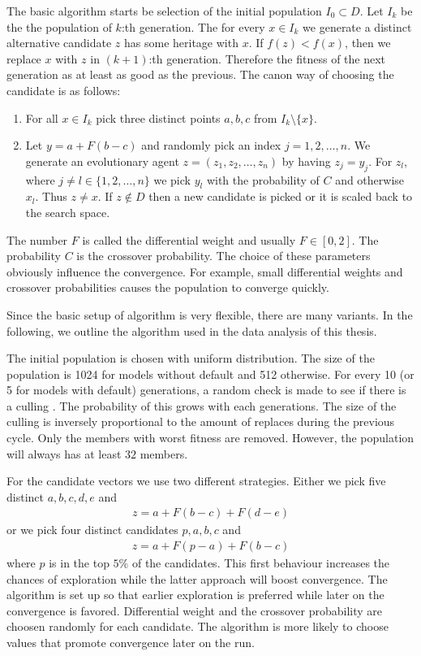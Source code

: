 The basic algorithm starts be selection of the initial population $I_0 \subset D$. Let $I_k$ be the the population of $k$:th generation. The for every $x \in I_k$ we generate a distinct alternative candidate $z$ has some heritage with $x$. If $f(z) < f(x)$, then we replace $x$ with $z$ in $(k+1)$:th generation. Therefore the fitness of the next generation as at least as good as the previous. The canon way of choosing the candidate is as follows: 

\begin{enumerate}
	\item For all $x \in I_k$ pick three distinct points $a, b, c$ from $I_k \setminus \{ x \}$.
	\item Let $y = a + F(b-c)$ and randomly pick an index $j = 1,2, \ldots, n$. We generate an evolutionary agent $z = (z_1, z_2, \ldots, z_n)$ by having $z_j = y_j$. For $z_l$, where $j \not = l \in \{1,2, \ldots, n\}$ we pick $y_l$ with the probability of $C$ and otherwise $x_l$. Thus $z \not = x$. If $z \not \in D$ then a new candidate is picked or it is scaled back to the search space.
\end{enumerate}

The number $F$ is called the differential weight and usually $F \in [ 0,2]$. The probability $C$ is the crossover probability. The choice of these parameters obviously influence the convergence. For example, small differential weights and crossover probabilities causes the population to converge quickly.

Since the basic setup of algorithm is very flexible, there are many variants. In the following, we outline the algorithm used in the data analysis of this thesis.

The initial population is chosen with uniform distribution. The size of the population is 1024 for models without default and 512 otherwise. For every 10 (or 5 for models with default) generations, a random check is made to see if there is a culling . The probability of this grows with each generations. The size of the culling is inversely proportional to the amount of replaces during the previous cycle. Only the members with worst fitness are removed. However, the population will always has at least $32$ members.

For the candidate vectors we use two different strategies. Either we pick five distinct $a,b,c,d,e$ and
	\begin{align}
		z = a + F(b-c) + F(d-e) 
	\end{align}
or we pick four distinct candidates $p, a, b, c$ and
	\begin{align}
	z = a + F(p-a) + F(b-c)
	\end{align}
where $p$ is in the top $5 \%$ of the candidates. This first behaviour increases the chances of exploration while the latter approach will boost convergence. The algorithm is set up so that earlier exploration is preferred while later on the convergence is favored. Differential weight and the crossover probability are choosen randomly for each candidate. The algorithm is more likely to choose values that promote convergence later on the run.


 
